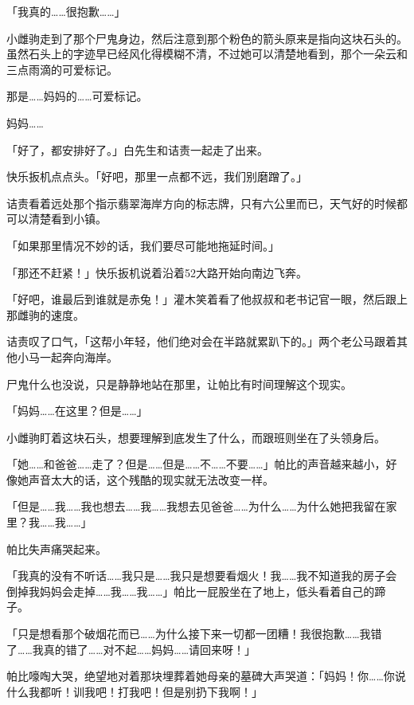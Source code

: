 「我真的……很抱歉……」

小雌驹走到了那个尸鬼身边，然后注意到那个粉色的箭头原来是指向这块石头的。虽然石头上的字迹早已经风化得模糊不清，不过她可以清楚地看到，那个一朵云和三点雨滴的可爱标记。

那是……妈妈的……可爱标记。

妈妈……{}

\horizonline


「好了，都安排好了。」白先生和诘责一起走了出来。

快乐扳机点点头。「好吧，那里一点都不远，我们别磨蹭了。」

诘责看着远处那个指示翡翠海岸方向的标志牌，只有六公里而已，天气好的时候都可以清楚看到小镇。

「如果那里情况不妙的话，我们要尽可能地拖延时间。」

「那还不赶紧！」快乐扳机说着沿着52大路开始向南边飞奔。

「好吧，谁最后到谁就是赤兔！」灌木笑着看了他叔叔和老书记官一眼，然后跟上那雌驹的速度。

诘责叹了口气，「这帮小年轻，他们绝对会在半路就累趴下的。」两个老公马跟着其他小马一起奔向海岸。

\horizonline


尸鬼什么也没说，只是静静地站在那里，让帕比有时间理解这个现实。

「妈妈……在这里？但是……」

小雌驹盯着这块石头，想要理解到底发生了什么，而跟班则坐在了头领身后。

「她……和爸爸……走了？但是……但是……不……不要……」帕比的声音越来越小，好像她声音太大的话，这个残酷的现实就无法改变一样。

「但是……我……我也想去……我……我想去见爸爸……为什么……为什么她把我留在家里？我……我……」

帕比失声痛哭起来。

「我真的没有不听话……我只是……我只是想要看烟火！我……我不知道我的房子会倒掉我妈妈会走掉……我……我……」帕比一屁股坐在了地上，低头看着自己的蹄子。

「只是想看那个破烟花而已……为什么接下来一切都一团糟！我很抱歉……我错了……我真的错了……对不起……妈妈……请回来呀！」

帕比嚎啕大哭，绝望地对着那块埋葬着她母亲的墓碑大声哭道：「妈妈！你……你说什么我都听！训我吧！打我吧！但是别扔下我啊！」

